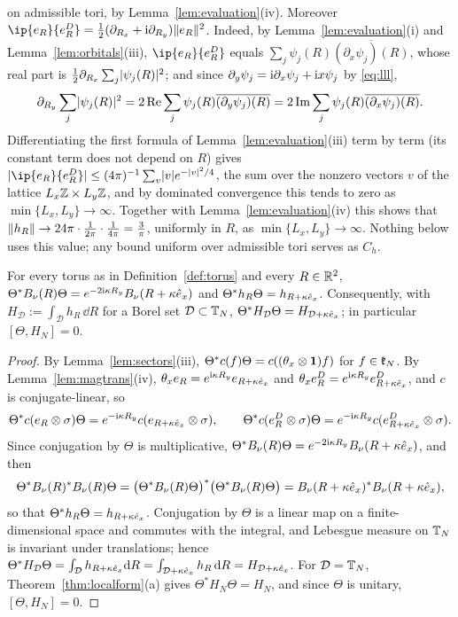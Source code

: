 on admissible tori, by Lemma~\ref{lem:evaluation}(iv). Moreover
$\ip{\ev R}{\evD R}=\frac12(\partial_{R_x}+\iu\partial_{R_y})\norm{\ev R}^2$. Indeed, by Lemma~\ref{lem:evaluation}(i) and
Lemma~\ref{lem:orbitals}(iii), $\ip{\ev R}{\evD R}$ equals $\sum_j\psi_j(R)\overline{(\partial_x\psi_j)(R)}$, whose real
part is $\frac12\partial_{R_x}\sum_j\lvert\psi_j(R)\rvert^2$; and since $\partial_y\psi_j=\mathrm{i}\partial_x\psi_j+\mathrm{i} x\psi_j$ by \eqref{eq:lll},
\[
\partial_{R_y}\sum_j\lvert\psi_j(R)\rvert^2=2\,\mathrm{Re}\sum_j\psi_j(R)\overline{(\partial_y\psi_j)(R)}
=2\,\mathrm{Im}\sum_j\psi_j(R)\overline{(\partial_x\psi_j)(R)} .
\]
Differentiating the first formula of Lemma~\ref{lem:evaluation}(iii) term by term (its constant term does not depend
on $R$) gives $\abs{\ip{\ev R}{\evD R}}\le(4\pi)^{-1}\sum_v\abs ve^{-\abs v^2/4}$, the sum over the nonzero vectors $v$ of
the lattice $L_x\mathbb{Z}\times L_y\mathbb{Z}$, and by dominated convergence this tends to zero as $\min\{L_x,L_y\}\to\infty$. Together with
Lemma~\ref{lem:evaluation}(iv) this shows that $\lVert h_R\rVert\to24\pi\cdot\frac1{2\pi}\cdot\frac1{4\pi}=\frac3\pi$, uniformly in $R$, as
$\min\{L_x,L_y\}\to\infty$. Nothing below uses this value; any bound uniform over admissible tori serves as $C_h$.

\begin{lemma}[covariance]\label{lem:covariance}
For every torus as in Definition~\ref{def:torus} and every $R\in\mathbb{R}^2$,
$\Theta^*B_\nu(R)\Theta=e^{-2\mathrm{i}\kappa R_y}B_\nu(R+\kappa\hat{e}_x)$ and $\Theta^*h_R\Theta=h_{R+\kappa\hat{e}_x}$. Consequently, with
$H_{\mathcal D}:=\int_{\mathcal D}h_R\,\dd R$ for a Borel set $\mathcal D\subset\mathbb{T}_N$,
$\Theta^*H_{\mathcal D}\Theta=H_{\mathcal D+\kappa\hat{e}_x}$; in particular $[\Theta,H_N]=0$.
\end{lemma}

\begin{proof}
By Lemma~\ref{lem:sectors}(iii), $\Theta^*c(f)\Theta=c((\theta_x\otimes\mathbf{1})f)$ for $f\in\mathfrak{k}_N$. By
Lemma~\ref{lem:magtrans}(iv), $\theta_xe_{R}=e^{\mathrm{i}\kappa R_y}e_{R+\kappa\hat{e}_x}$ and $\theta_xe^{D}_{R}=e^{\mathrm{i}\kappa R_y}e^{D}_{R+\kappa\hat{e}_x}$, and
$c$ is conjugate-linear, so
\[
\Theta^*c(e_{R}\otimes\sigma)\Theta=e^{-\mathrm{i}\kappa R_y}c(e_{R+\kappa\hat{e}_x}\otimes\sigma),\qquad
\Theta^*c(e^{D}_{R}\otimes\sigma)\Theta=e^{-\mathrm{i}\kappa R_y}c(e^{D}_{R+\kappa\hat{e}_x}\otimes\sigma).
\]
Since conjugation by $\Theta$ is multiplicative, $\Theta^*B_\nu(R)\Theta=e^{-2\mathrm{i}\kappa R_y}B_\nu(R+\kappa\hat{e}_x)$, and then
\[
\Theta^*B_\nu(R)^*B_\nu(R)\Theta=\bigl(\Theta^*B_\nu(R)\Theta\bigr)^*\bigl(\Theta^*B_\nu(R)\Theta\bigr)=B_\nu(R+\kappa\hat{e}_x)^*B_\nu(R+\kappa\hat{e}_x),
\]
so that $\Theta^*h_R\Theta=h_{R+\kappa\hat{e}_x}$. Conjugation by $\Theta$ is a linear map on a finite-dimensional space and commutes with
the integral, and Lebesgue measure on $\mathbb{T}_N$ is invariant under translations; hence
$\Theta^*H_{\mathcal D}\Theta=\int_{\mathcal D}h_{R+\kappa\hat{e}_x}\mathrm{d} R=\int_{\mathcal D+\kappa\hat{e}_x}h_R\,\mathrm{d} R=H_{\mathcal D+\kappa\hat{e}_x}$. For
$\mathcal D=\mathbb{T}_N$, Theorem~\ref{thm:localform}(a) gives $\Theta^*H_N\Theta=H_N$, and since $\Theta$ is unitary, $[\Theta,H_N]=0$.
\end{proof}

